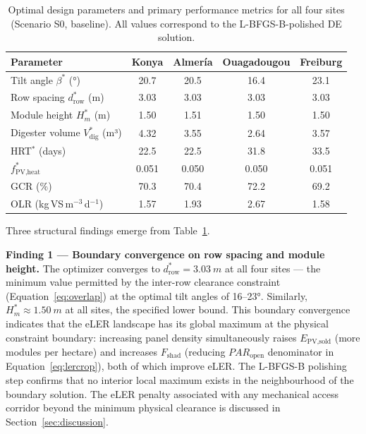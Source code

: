\begin{table}[H]
	\caption{Optimal design parameters and primary performance metrics
		for all four sites (Scenario S0, baseline). All values correspond
		to the L-BFGS-B-polished DE solution.}
	\label{tab:optimal}
	\centering
	\begin{tabular}{lcccc}
		\toprule
		\textbf{Parameter} & \textbf{Konya} & \textbf{Almer\'{i}a}
		& \textbf{Ouagadougou} & \textbf{Freiburg} \\
		\midrule
		Tilt angle $\beta^*$ (°)       & 20.7  & 20.5  & 16.4  & 23.1  \\
		Row spacing $d_{\text{row}}^*$ (m) & 3.03 & 3.03 & 3.03 & 3.03 \\
		Module height $H_m^*$ (m)      & 1.50  & 1.51  & 1.50  & 1.50  \\
		Digester volume $V_{\text{dig}}^*$ (m³) & 4.32 & 3.55 & 2.64 & 3.57 \\
		HRT$^*$ (days)                 & 22.5  & 22.5  & 31.8  & 33.5  \\
		$f_{\text{PV,heat}}^*$         & 0.051 & 0.050 & 0.050 & 0.051 \\
		GCR (\%)                       & 70.3  & 70.4  & 72.2  & 69.2  \\
		OLR (kg\,VS\,m$^{-3}$\,d$^{-1}$) & 1.57 & 1.93 & 2.67 & 1.58 \\
		\bottomrule
	\end{tabular}
\end{table}

Three structural findings emerge from Table~\ref{tab:optimal}.

\textbf{Finding 1 --- Boundary convergence on row spacing and module
	height.} The optimizer converges to $d_{\text{row}}^* = \SI{3.03}{m}$
at all four sites --- the minimum value permitted by the inter-row
clearance constraint (Equation~\ref{eq:overlap}) at the optimal tilt
angles of 16--23°. Similarly, $H_m^* \approx \SI{1.50}{m}$ at all sites,
the specified lower bound. This boundary convergence indicates that
the eLER landscape has its global maximum at the physical constraint
boundary: increasing panel density simultaneously raises
$E_{\text{PV,sold}}$ (more modules per hectare) and increases
$F_{\text{shad}}$ (reducing $PAR_{\text{open}}$ denominator in
Equation~\ref{eq:lercrop}), both of which improve eLER. The
L-BFGS-B polishing step confirms that no interior local maximum
exists in the neighbourhood of the boundary solution. The eLER
penalty associated with any mechanical access corridor beyond the
minimum physical clearance is discussed in
Section~\ref{sec:discussion}.

